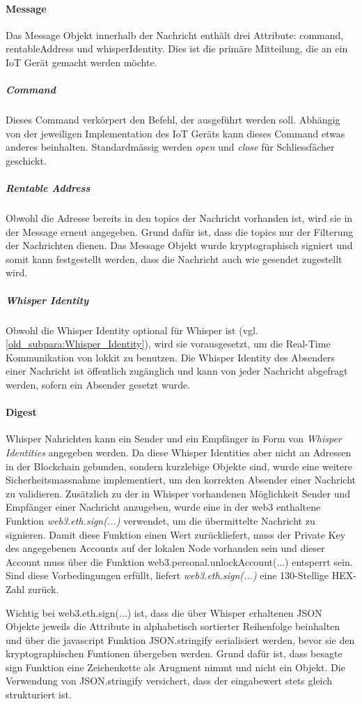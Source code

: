 \paragraph{Message}
Das Message Objekt innerhalb der Nachricht enthält drei Attribute: command, rentableAddress und whisperIdentity. Dies ist die primäre Mitteilung, die an ein IoT Gerät gemacht werden möchte.
\subparagraph{Command}
Dieses Command verkörpert den Befehl, der ausgeführt werden soll. Abhängig von der jeweiligen Implementation des IoT Geräts kann dieses Command etwas anderes beinhalten. Standardmässig werden \emph{open} und \emph{close} für Schliessfächer geschickt.
\subparagraph{Rentable Address}
Obwohl die Adresse bereits in den topics der Nachricht vorhanden ist, wird sie in der Message erneut angegeben. Grund dafür ist, dass die topics nur der Filterung der Nachrichten dienen. Das Message Objekt wurde kryptographisch signiert und somit kann festgestellt werden, dass die Nachricht auch wie gesendet zugestellt wird.
\subparagraph{Whisper Identity}
Obwohl die Whisper Identity optional für Whisper ist (vgl. \ref{old_subpara:Whisper_Identity}), wird sie vorausgesetzt, um die Real-Time Kommunikation von lokkit zu benutzen. Die Whisper Identity des Absenders einer Nachricht ist öffentlich zugänglich und kann von jeder Nachricht abgefragt werden, sofern ein Absender gesetzt wurde.

\paragraph{Digest}
Whisper Nahrichten kann ein Sender und ein Empfänger in Form von \emph{Whisper Identities} angegeben werden. Da diese Whisper Identities aber nicht an Adressen in der Blockchain gebunden, sondern kurzlebige Objekte sind, wurde eine weitere Sicherheitsmassnahme implementiert, um den korrekten Absender einer Nachricht zu validieren.
Zusätzlich zu der in Whisper vorhandenen Möglichkeit Sender und Empfänger einer Nachricht anzugeben, wurde eine in der web3 enthaltene Funktion \emph{web3.eth.sign(...)} verwendet, um die übermittelte Nachricht zu signieren. Damit diese Funktion einen Wert zurückliefert, muss der Private Key des angegebenen Accounts auf der lokalen Node vorhanden sein und dieser Account muss über die Funktion web3.personal.unlockAccount(...) entsperrt sein. Sind diese Vorbedingungen erfüllt, liefert \emph{web3.eth.sign(...)} eine 130-Stellige HEX-Zahl zurück.

Wichtig bei web3.eth.sign(...) ist, dass die über Whisper erhaltenen JSON Objekte jeweils die Attribute in alphabetisch sortierter Reihenfolge beinhalten und über die javascript Funktion JSON.stringify serialisiert werden, bevor sie den kryptographischen Funtionen übergeben werden. Grund dafür ist, dass besagte sign Funktion eine Zeichenkette als Arugment nimmt und nicht ein Objekt. Die Verwendung von JSON.stringify versichert, dass der eingabewert stets gleich strukturiert ist.


